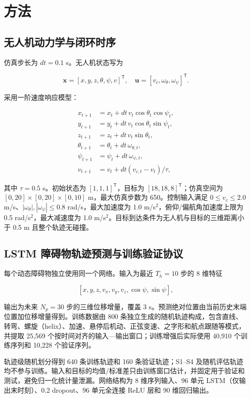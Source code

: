 \documentclass[11pt,a4paper]{ctexart}
\begin{document}
\section{方法}

\subsection{无人机动力学与闭环时序}

仿真步长为 $dt=0.1$ s。无人机状态写为

\[
\mathbf{x}=[x,y,z,\theta,\psi,v]^\mathsf{T},\quad
\mathbf{u}=[v_c,\omega_\theta,\omega_\psi]^\mathsf{T}.
\]

采用一阶速度响应模型：

\[
\begin{aligned}
x_{t+1}&=x_t+dt\,v_t\cos\theta_t\cos\psi_t,\\
y_{t+1}&=y_t+dt\,v_t\cos\theta_t\sin\psi_t,\\
z_{t+1}&=z_t+dt\,v_t\sin\theta_t,\\
\theta_{t+1}&=\theta_t+dt\,\omega_{\theta,t},\\
\psi_{t+1}&=\psi_t+dt\,\omega_{\psi,t},\\
v_{t+1}&=v_t+dt(v_{c,t}-v_t)/\tau,
\end{aligned}
\]

其中 $\tau=0.5$ s。初始状态为 $[1,1,1]^{\mathsf T}$，目标为 $[18,18,8]^{\mathsf T}$；仿真空间为 $[0,20]\times[0,20]\times[0,10]$ m，最大仿真步数为 650。控制输入满足 $0\leq v_c\leq2.0$ m/s、$|\omega_\theta|,|\omega_\psi|\leq0.8$ rad/s，最大加速度为 1.0 m/s$^2$，俯仰/偏航角加速度上限为 0.5 rad/s$^2$，最大减速度为 1.0 m/s$^2$。目标到达条件为无人机与目标的三维距离小于 0.5 m 且整个轨迹无碰撞。

\subsection{LSTM 障碍物轨迹预测与训练验证协议}

每个动态障碍物独立使用同一个网络。输入为最近 $T_h=10$ 步的 8 维特征

\[
[x,y,z,v_x,v_y,v_z,\cos\psi,\sin\psi],
\]

输出为未来 $N_p=30$ 步的三维位移增量，覆盖 3 s。预测绝对位置由当前历史末端位置加位移增量得到。训练数据由 800 条独立生成的随机轨迹构成，包含直线、转弯、螺旋（helix）、加速、悬停后机动、正弦变速、之字形和航点跟随等模式，共提取 25,569 个按时间对齐的输入—输出窗口；训练增强后实际使用 40,910 个训练序列和 10,228 个验证序列。

轨迹级随机划分得到 640 条训练轨迹和 160 条验证轨迹；S1–S4 及随机评估轨迹均不参与训练。输入和目标的均值/标准差只由训练窗口估计，并固定用于验证和测试，避免归一化统计量泄漏。网络结构为 8 维序列输入、96 单元 LSTM（仅输出末时刻）、0.2 dropout、96 单元全连接 ReLU 层和 90 维回归输出。
\end{document}
